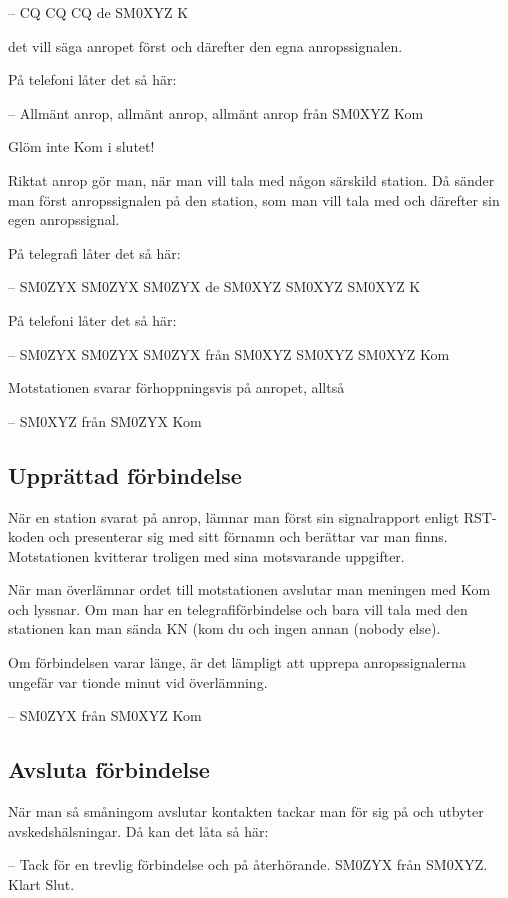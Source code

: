 -- CQ CQ CQ de SM0XYZ K

det vill säga anropet först och därefter den egna anropssignalen.

På telefoni låter det så här:

-- Allmänt anrop, allmänt anrop, allmänt anrop från SM0XYZ Kom

Glöm inte Kom i slutet!

Riktat anrop gör man, när man vill tala med någon särskild station.
Då sänder man först anropssignalen på den station, som man vill tala med och
därefter sin egen anropssignal.

På telegrafi låter det så här:

-- SM0ZYX SM0ZYX SM0ZYX de SM0XYZ SM0XYZ SM0XYZ K

På telefoni låter det så här:

-- SM0ZYX SM0ZYX SM0ZYX från SM0XYZ SM0XYZ SM0XYZ Kom

Motstationen svarar förhoppningsvis på anropet, alltså

-- SM0XYZ från SM0ZYX Kom

\subsection{Upprättad förbindelse}

När en station svarat på anrop, lämnar man först sin signalrapport
enligt RST-koden och presenterar sig med sitt förnamn och berättar var man finns.
Motstationen kvitterar troligen med sina motsvarande uppgifter.

När man överlämnar ordet till motstationen avslutar man meningen med Kom och lyssnar.
Om man har en telegrafiförbindelse och bara vill tala med den stationen kan man
sända KN (kom du och ingen annan (nobody else).

Om förbindelsen varar länge, är det lämpligt att upprepa anropssignalerna
ungefär var tionde minut vid överlämning.

-- SM0ZYX från SM0XYZ Kom

\subsection{Avsluta förbindelse}

När man så småningom avslutar kontakten tackar man för sig på och utbyter
avskedshälsningar. Då kan det låta så här:

-- Tack för en trevlig förbindelse och på återhörande. SM0ZYX från
SM0XYZ. Klart Slut.


